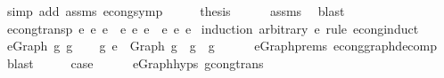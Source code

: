 \begin{isabellebody}
\ {\isacharparenleft}{\kern0pt}simp\ add{\isacharcolon}{\kern0pt}\ assms\ econg{\isacharunderscore}{\kern0pt}symp{\isacharparenright}{\kern0pt}\isanewline
\ \ \isamarkupfalse%
\ \isamarkupfalse%
\ {\isacharquery}{\kern0pt}thesis\isanewline
\ \ \ \ \isamarkupfalse%
\ assms\ \isamarkupfalse%
\ blast\isanewline
{}\isamarkupfalse%
%
\endisatagproof
{\isafoldproof}%
%
\isadelimproof
\isanewline
%
\endisadelimproof
\isanewline
\isanewline
{}\isamarkupfalse%
\ econg{\isacharunderscore}{\kern0pt}transp{\isacharcolon}{\kern0pt}\ {\isachardoublequoteopen}e\ {\isasymsimeq}e\ e{\isacharprime}{\kern0pt}\ {\isacharequal}{\kern0pt}{\isacharequal}{\kern0pt}{\isachargreater}{\kern0pt}\ e{\isacharprime}{\kern0pt}\ {\isasymsimeq}e\ e{\isacharprime}{\kern0pt}{\isacharprime}{\kern0pt}\ {\isacharequal}{\kern0pt}{\isacharequal}{\kern0pt}{\isachargreater}{\kern0pt}\ e\ {\isasymsimeq}e\ e{\isacharprime}{\kern0pt}{\isacharprime}{\kern0pt}{\isachardoublequoteclose}\isanewline
%
\isadelimproof
%
\endisadelimproof
%
\isatagproof
{}\isamarkupfalse%
\ {\isacharparenleft}{\kern0pt}induction\ arbitrary{\isacharcolon}{\kern0pt}\ e{\isacharprime}{\kern0pt}{\isacharprime}{\kern0pt}\ rule{\isacharcolon}{\kern0pt}\ econg{\isachardot}{\kern0pt}induct{\isacharparenright}{\kern0pt}\isanewline
\ \ \isamarkupfalse%
\ {\isacharparenleft}{\kern0pt}e{\isacharunderscore}{\kern0pt}Graph\ g\ g{\isacharprime}{\kern0pt}{\isacharparenright}{\kern0pt}\isanewline
\ \ \isamarkupfalse%
\ {\isachardoublequoteopen}{\isasymexists}g{\isacharprime}{\kern0pt}{\isacharprime}{\kern0pt}{\isachardot}{\kern0pt}\ e{\isacharprime}{\kern0pt}{\isacharprime}{\kern0pt}\ {\isacharequal}{\kern0pt}\ Graph\ g{\isacharprime}{\kern0pt}{\isacharprime}{\kern0pt}\ {\isasymand}\ g{\isacharprime}{\kern0pt}\ {\isasymsimeq}\ g{\isacharprime}{\kern0pt}{\isacharprime}{\kern0pt}{\isachardoublequoteclose}\isanewline
\ \ \ \ \isamarkupfalse%
\ e{\isacharunderscore}{\kern0pt}Graph{\isachardot}{\kern0pt}prems\ econg{\isacharunderscore}{\kern0pt}graph{\isacharunderscore}{\kern0pt}decomp{}\ \isamarkupfalse%
\ blast\isanewline
\ \ \isamarkupfalse%
\ \isamarkupfalse%
\ {\isacharquery}{\kern0pt}case\isanewline
\ \ \ \ \isamarkupfalse%
\ e{\isacharunderscore}{\kern0pt}Graph{\isachardot}{\kern0pt}hyps\ gcong{\isachardot}{\kern0pt}trans\ \isamarkupfalse%

\end{isabellebody}
